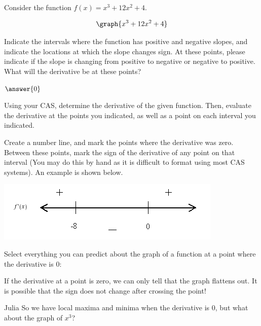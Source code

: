 \documentclass{ximera}
\begin{document}
\begin{question}
Consider the function $f(x)=x^3+12x^2+4$.

\[
\graph{x^3+12x^2+4}
\]

Indicate the intervals where the function has positive and negative slopes, and indicate the locations at which the slope changes sign. At these points, please indicate if the slope is changing from positive to negative or negative to positive. What will the derivative be at these points?

$\answer{0}$

Using your CAS, determine the derivative of the given function. Then, evaluate the derivative at the points you indicated, as well as a point on each interval you indicated.

Create a number line, and mark the points where the derivative was zero. Between these points, mark the sign of the derivative of any point on that interval (You may do this by hand as it is difficult to format using most CAS systems). An example is shown below.

\begin{image}
\includegraphics{Numberline}
\end{image}

Select everything you can predict about the graph of a function at a point where the derivative is 0:

\begin{selectAll}
\end{selectAll}
\begin{feedback}
If the derivative at a point is zero, we can only tell that the graph flattens out. It is possible that the sign does not change after crossing the point!
\end{feedback}
\end{question}

\begin{dialogue}
\item[Julia] So we have local maxima and minima when the derivative is 0, but what about the graph of $x^3$?
\end{dialogue}
\end{document}
